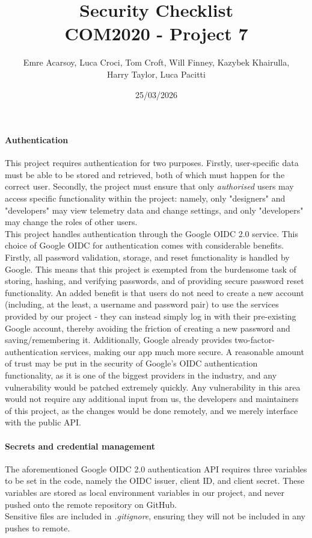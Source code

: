 \documentclass[11pt]{article}
\title{Security Checklist\\[0.3em]
\large COM2020 - Project 7}
\author{Emre Acarsoy, Luca Croci, Tom Croft, Will Finney, Kazybek Khairulla, \\ Harry Taylor, Luca Pacitti}
\date{25/03/2026}
\begin{document}
\maketitle

\paragraph{Authentication}
This project requires authentication for two purposes. Firstly, user-specific data must be able to be stored and retrieved, both of which must happen for the correct user. Secondly, the project must ensure that only \textit{authorised} users may access specific functionality within the project: namely, only "designers" and "developers" may view telemetry data and change settings, and only "developers" may change the roles of other users. \\
This project handles authentication through the Google OIDC 2.0 service. This choice of Google OIDC for authentication comes with considerable benefits. Firstly, all password validation, storage, and reset functionality is handled by Google. This means that this project is exempted from the burdensome task of storing, hashing, and verifying passwords, and of providing secure password reset functionality. An added benefit is that users do not need to create a new account (including, at the least, a username and password pair) to use the services provided by our project - they can instead simply log in with their pre-existing Google account, thereby avoiding the friction of creating a new password and saving/remembering it. Additionally, Google already provides two-factor-authentication services, making our app much more secure. A reasonable amount of trust may be put in the security of Google's OIDC authentication functionality, as it is one of the biggest providers in the industry, and any vulnerability would be patched extremely quickly. Any vulnerability in this area would not require any additional input from us, the developers and maintainers of this project, as the changes would be done remotely, and we merely interface with the public API.  

\paragraph{Secrets and credential management}
The aforementioned Google OIDC 2.0 authentication API requires three variables to be set in the code, namely the OIDC issuer, client ID, and client secret. These variables are stored as local environment variables in our project, and never pushed onto the remote repository on GitHub. \\
Sensitive files are included in \textit{.gitignore}, ensuring they will not be included in any pushes to remote.
\end{document}
